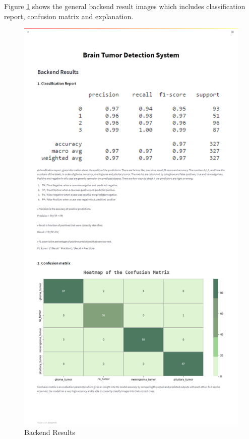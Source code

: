 Figure \ref{fig:page4} shows the general backend result images which includes classification report, confusion matrix and explanation. 
\begin{figure}[H]
\includegraphics[scale=0.28]{Photos/Page4.png}
\caption{Backend Results} \label{fig:page4}
\end{figure}

